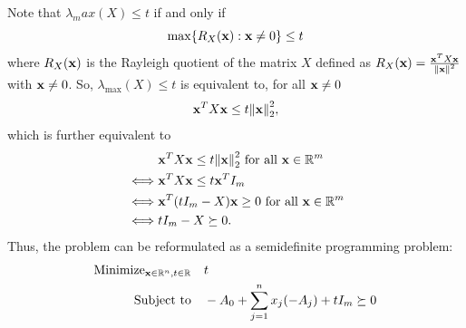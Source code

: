 \begin{enumerate}[label=(\arabic*)]
          Note that \(\lambda_max(X) \leq t\) if and only if
          \[\max\{R_X(\mathbf{x}) : \mathbf{x} \neq 0\} \leq t\]
          where \(R_X(\mathbf{x})\) is the Rayleigh quotient of the matrix \(X\) defined as \(R_X(\mathbf{x}) = \frac{\mathbf{x}^T X\mathbf{x}}{\norm{\mathbf{x}}^2}\) with \(\mathbf{x} \neq 0\). So, \(\lambda_{\max} (X) \leq t\) is equivalent to, for all \(\mathbf{x} \neq 0\)
          \[\mathbf{x}^T X \mathbf{x} \leq t \norm{\mathbf{x}}_2^2,\]
          which is further equivalent to
          \begin{align*}
                   & \mathbf{x}^T X\mathbf{x} \leq t \norm{\mathbf{x}}_2^2 \text{ for all } \mathbf{x} \in \mathbb{R}^m \\
              \iff & \mathbf{x}^T X \mathbf{x} \leq t \mathbf{x}^T I_m                                    \\
              \iff & \mathbf{x}^T (t I_m - X) \mathbf{x} \geq 0 \text{ for all } \mathbf{x} \in \mathbb{R}^m     \\
              \iff & tI_m - X \succeq 0.
          \end{align*}
          Thus, the problem can be reformulated as a semidefinite programming problem:
          \begin{align*}
              \text{Minimize}_{\mathbf{x} \in \mathbb{R}^n, t \in \mathbb{R}} \quad & t                                                  \\
              \text{Subject to} \quad                          & -A_0 + \sum_{j = 1}^n x_j (-A_j) + t I_m \succeq 0
          \end{align*}


\end{enumerate}
